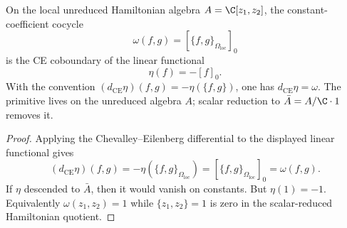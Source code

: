 \begin{lem}
\label{lem:app-unreduced-scalar-primitive}
  On the local unreduced Hamiltonian algebra \(A=\C[z_1,z_2]\), the
  constant-coefficient cocycle
  \[
    \omega(f,g)=[\{f,g\}_{\Omega_{\mathrm{loc}}}]_0
  \]
  is the CE coboundary of the linear functional
  \[
    \eta(f)=-[f]_0 .
  \]
  With the convention
  \((d_{\mathrm{CE}}\eta)(f,g)=-\eta(\{f,g\})\), one has
  \(d_{\mathrm{CE}}\eta=\omega\).  The primitive lives on the unreduced
  algebra \(A\); scalar reduction to \(\bar A=A/\C\cdot1\) removes it.
\end{lem}

\begin{proof}
  Applying the Chevalley--Eilenberg differential to the displayed
  linear functional gives
  \[
    (d_{\mathrm{CE}}\eta)(f,g)
      =-\eta(\{f,g\}_{\Omega_{\mathrm{loc}}})
      =[\{f,g\}_{\Omega_{\mathrm{loc}}}]_0
      =\omega(f,g).
  \]
  If \(\eta\) descended to \(\bar A\), then it would vanish on
  constants.  But \(\eta(1)=-1\).  Equivalently
  \(\omega(z_1,z_2)=1\) while \(\{z_1,z_2\}=1\) is zero in the
  scalar-reduced Hamiltonian quotient.
\end{proof}

